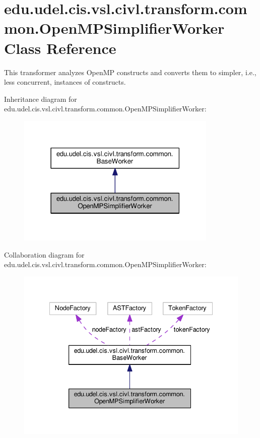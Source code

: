 \hypertarget{classedu_1_1udel_1_1cis_1_1vsl_1_1civl_1_1transform_1_1common_1_1OpenMPSimplifierWorker}{}\section{edu.\+udel.\+cis.\+vsl.\+civl.\+transform.\+common.\+Open\+M\+P\+Simplifier\+Worker Class Reference}
\label{classedu_1_1udel_1_1cis_1_1vsl_1_1civl_1_1transform_1_1common_1_1OpenMPSimplifierWorker}


This transformer analyzes Open\+M\+P constructs and converts them to simpler, i.\+e., less concurrent, instances of constructs.  




Inheritance diagram for edu.\+udel.\+cis.\+vsl.\+civl.\+transform.\+common.\+Open\+M\+P\+Simplifier\+Worker\+:
\nopagebreak
\begin{figure}[H]
\begin{center}
\leavevmode
\includegraphics[width=271pt]{classedu_1_1udel_1_1cis_1_1vsl_1_1civl_1_1transform_1_1common_1_1OpenMPSimplifierWorker__inherit__graph}
\end{center}
\end{figure}


Collaboration diagram for edu.\+udel.\+cis.\+vsl.\+civl.\+transform.\+common.\+Open\+M\+P\+Simplifier\+Worker\+:
\nopagebreak
\begin{figure}[H]
\begin{center}
\leavevmode
\includegraphics[width=335pt]{classedu_1_1udel_1_1cis_1_1vsl_1_1civl_1_1transform_1_1common_1_1OpenMPSimplifierWorker__coll__graph}
\end{center}
\end{figure}
